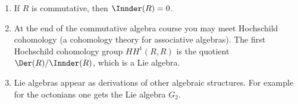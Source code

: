 \begin{enumerate}[label=(\arabic*)]
	\item If $R$ is commutative, then $\Innder(R) = 0$.
	\item At the end of the commutative algebra course you may meet Hochschild
		cohomology (a cohomology theory for associative algebras). The first
		Hochschild cohomology group $HH^1(R, R)$ is the quotient
		$\Der(R)/\Innder(R)$, which is a Lie algebra.
	\item Lie algebras appear as derivations of other algebraic structures. For
		example for the octonians one gets the Lie algebra $G_2$.
\end{enumerate}
